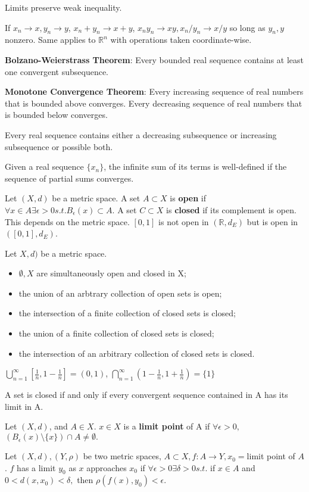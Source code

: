 \documentclass[11pt]{article} %
\begin{document}
Limits preserve weak inequality.

If $x_n \rightarrow x, y_n \rightarrow y$, $x_n + y_n \rightarrow x + y$, $x_ny_n \rightarrow xy, x_n/y_n \rightarrow x/y$ so long as $y_n,y$ nonzero. Same applies to $\mathbb{R}^n$ with operations taken coordinate-wise.

\textbf{Bolzano-Weierstrass Theorem}: Every bounded real sequence contains at least one convergent subsequence.

\textbf{Monotone Convergence Theorem}: Every increasing sequence of real numbers that is bounded above converges. Every decreasing sequence of real numbers that is bounded below converges.

Every real sequence contains either a decreasing subsequence or increasing subsequence or possible both.

Given a real sequence $\{ x_n\}$, the infinite sum of its terms is well-defined if the sequence of partial sums converges.

Let $(X,d)$ be a metric space. A set $A\subset X$ is \textbf{open} if $\forall x \in A \exists \epsilon > 0 s.t. B_\epsilon(x) \subset A.$ A set $C \subset X$ is \textbf{closed} if its complement is open. This depends on the metric space. $[0,1]$ is not open in $(\mathbb{R},d_E)$ but is open in $([0,1],d_E)$.

Let $X,d)$ be a metric space.
\begin{itemize}
\item $\emptyset,X$ are simultaneously open and closed in X;
\item the union of an arbtrary collection of open sets is open;
\item the intersection of a finite collection of closed sets is closed;
\item the union of a finite collection of closed sets is closed;
\item the intersection of an arbitrary collection of closed sets is closed.
\end{itemize}
$\bigcup_{n=1}^{\infty}\left[ \frac{1}{n}, 1 - \frac{1}{n}\right] = (0,1)$, $\bigcap_{n=1}^{\infty}\left(1- \frac{1}{n}, 1 + \frac{1}{n}\right) = \{1\}$

A set is closed if and only if every convergent sequence contained in A has its limit in A.

Let $(X,d)$, and $A \in X$. $x \in X$ is a \textbf{limit point} of A if $\forall \epsilon > 0,$ $(B_{\epsilon}(x) \setminus \{ x\})\cap A \neq \emptyset.$

Let $(X,d),(Y,\rho)$ be two metric spaces, $A \subset X, f:A \rightarrow Y, x_0 =$limit point of $A$. $f$ has a limit $y_0$ as $x$ approaches $x_0$ if $\forall \epsilon>0 \exists \delta > 0 s.t.$ if $x \in A$ and $0<d(x,x_0) < \delta,$ then $\rho(f(x),y_0) < \epsilon.$
\end{document}
